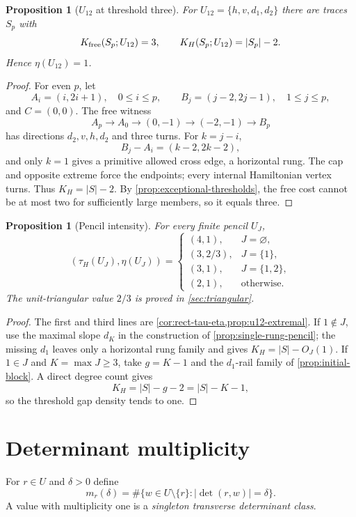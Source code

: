 \documentclass[11pt]{article}
\newtheorem{proposition}[theorem]{Proposition}
\theoremstyle{definition}
\begin{document}
\begin{proposition}[$U_{12}$ at threshold three]\label{prop:u12-extremal}
For $U_{12}=\{h,v,d_1,d_2\}$ there are traces $S_p$ with
\[
K_{\rm free}(S_p;U_{12})=3,
\qquad
K_H(S_p;U_{12})=|S_p|-2.
\]
Hence $\eta(U_{12})=1$.
\end{proposition}
\begin{proof}
For even $p$, let
\[
A_i=(i,2i+1),\quad0\le i\le p,
\qquad B_j=(j-2,2j-1),\quad1\le j\le p,
\]
and $C=(0,0)$.  The free witness
\[
A_p\to A_0\to(0,-1)\to(-2,-1)\to B_p
\]
has directions $d_2,v,h,d_2$ and three turns.  For $k=j-i$,
\[
B_j-A_i=(k-2,2k-2),
\]
and only $k=1$ gives a primitive allowed cross edge, a horizontal rung.  The cap and opposite extreme force the endpoints; every internal Hamiltonian vertex turns.  Thus $K_H=|S|-2$.  By \cref{prop:exceptional-thresholds}, the free cost cannot be at most two for sufficiently large members, so it equals three.
\end{proof}

\begin{proposition}[Pencil intensity]\label{prop:pencil-intensity}
For every finite pencil $U_J$,
\[
(\tau_H(U_J),\eta(U_J))=
\begin{cases}
(4,1),&J=\varnothing,\\
(3,2/3),&J=\{1\},\\
(3,1),&J=\{1,2\},\\
(2,1),&\text{otherwise}.
\end{cases}
\]
The unit-triangular value $2/3$ is proved in \cref{sec:triangular}.
\end{proposition}
\begin{proof}
The first and third lines are \cref{cor:rect-tau-eta,prop:u12-extremal}.  If $1\notin J$, use the maximal slope $d_K$ in the construction of \cref{prop:single-rung-pencil}; the missing $d_1$ leaves only a horizontal rung family and gives $K_H=|S|-O_J(1)$.  If $1\in J$ and $K=\max J\ge3$, take $g=K-1$ and the $d_1$-rail family of \cref{prop:initial-block}.  A direct degree count gives
\[
K_H=|S|-g-2=|S|-K-1,
\]
so the threshold gap density tends to one.
\end{proof}

\section{Determinant multiplicity}\label{sec:determinant}
For $r\in U$ and $\delta>0$ define
\[
m_r(\delta)=\#\{w\in U\setminus\{r\}:|\det(r,w)|=\delta\}.
\]
A value with multiplicity one is a \emph{singleton transverse determinant class}.
\end{document}
